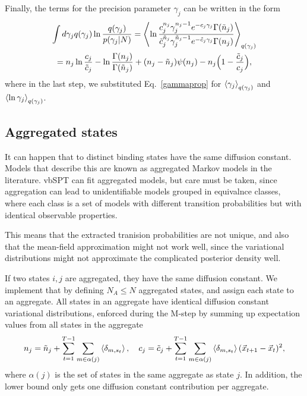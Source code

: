 Finally, the terms for the precision parameter $\gamma_j$ can be
written in the form
\begin{multline}
\int d\gamma_j q(\gamma_j)\ln\frac{q(\gamma_j)}{p(\gamma_j|N)}
=\left\langle \ln\frac{c_j^{n_j}\gamma_j^{n_j-1}e^{-c_j\gamma_j}\Gamma(\tilde n_j)}
      {\tilde c_j^{\tilde n_j}\gamma_j^{\tilde n_j-1}e^{-\tilde c_j\gamma_j}\Gamma(n_j)}\right\rangle_{q(\gamma_j)}\\
=n_j\ln\frac{c_j}{\tilde c_j}                    
-\ln\frac{\Gamma(n_j)}{\Gamma(\tilde n_j)}
+(n_j-\tilde n_j)\psi(n_j)
-n_j\Big(1-\frac{\tilde c_j}{c_j}\Big),
\end{multline}
where in the last step, we substituted Eq.~\eqref{gammaprop} for
$\left\langle \gamma_j\right\rangle_{q(\gamma_j)}$ and
$\left\langle \ln\gamma_j\right\rangle_{q(\gamma_j)}$.

\subsection{Aggregated states}
It can happen that to distinct binding states have the same diffusion
constant. Models that describe this are known as aggregated Markov
models in the
literature\cite{Fredkin1986,Kienker1989,Bruno2005,Flomenbom2006}. vbSPT
can fit aggregated models, but care must be taken, since aggregation
can lead to unidentifiable models grouped in equivalnce classes, where
each class is a set of models with different transition probabilities
but with identical observable properties.

This means that the extracted tranision probabilities are not unique,
and also that the mean-field approximation might not work well, since
the variational distributions might not approximate the complicated
posterior density well.

If two states $i,j$ are aggregated, they have the same diffusion
constant. We implement that by defining $N_A\le N$ aggregated states,
and assign each state to an aggregate. All states in an aggregate have
identical diffusion constant variational distributions, enforced
during the M-step by summing up expectation values from all states in
the aggregate 
\begin{equation}
n_j=\tilde n_j+\sum_{t=1}^{T-1}\sum_{m\in \alpha(j)}\left\langle \delta_{m,s_t}\right\rangle,\quad
c_j=\tilde c_j+\sum_{t=1}^{T-1}\sum_{m\in \alpha(j)}
           \left\langle \delta_{m,s_t}\right\rangle(\vec x_{t+1}-\vec x_t)^2,
\end{equation}
where $\alpha(j)$ is the set of states in the same aggregate as state
$j$. In addition, the lower bound only gets one diffusion constant
contribution per aggregate.

